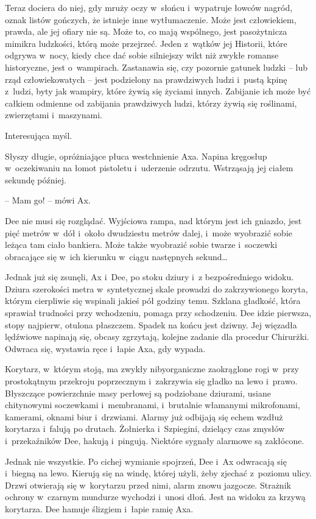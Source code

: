 \documentclass[oneside,polish,11pt,sfheadings]{mwbk}
\begin{document}
Teraz dociera do niej, gdy mruży oczy w~słońcu i~wypatruje łowców
nagród, oznak listów gończych, że istnieje inne wytłumaczenie. Może jest
człowiekiem, prawda, ale jej ofiary nie są. Może to, co mają wspólnego,
jest pasożytnicza mimikra ludzkości, którą może przejrzeć. Jeden z~wątków jej Historii, które odgrywa w~nocy, kiedy chce dać sobie
silniejszy wikt niż zwykłe romanse historyczne, jest o~wampirach.
Zastanawia się, czy pozornie gatunek ludzki -- lub rząd człowiekowatych -- jest podzielony na prawdziwych ludzi i~pustą kpinę z~ludzi, byty jak
wampiry, które żywią się życiami innych. Zabijanie ich może być całkiem
odmienne od zabijania prawdziwych ludzi, którzy żywią się roślinami,
zwierzętami i~maszynami.

Interesująca myśl.

Słyszy długie, opróżniające płuca westchnienie Axa. Napina kręgosłup w~oczekiwaniu na łomot pistoletu i~uderzenie odrzutu. Wstrząsają jej
ciałem sekundę później.

-- Mam go! -- mówi Ax.

Dee nie musi się rozglądać. Wyjściowa rampa, nad którym jest ich
gniazdo, jest pięć metrów w~dół i~około dwudziestu metrów dalej, i~może
wyobrazić sobie leżąca tam ciało bankiera. Może także wyobrazić sobie
twarze i~soczewki obracające się w~ich kierunku w~ciągu następnych
sekund\ldots

Jednak już się zsunęli, Ax i~Dee, po stoku dziury i~z bezpośredniego
widoku. Dziura szerokości metra w~syntetycznej skale prowadzi do
zakrzywionego koryta, którym cierpliwie się wspinali jakieś pół godziny
temu. Szklana gładkość, która sprawiał trudności przy wchodzeniu, pomaga
przy schodzeniu. Dee idzie pierwsza, stopy najpierw, otulona płaszczem.
Spadek na końcu jest dziwny. Jej więzadła lędźwiowe napinają się, obcasy
zgrzytają, kolejne zadanie dla procedur Chirurżki. Odwraca się, wystawia
ręce i~łapie Axa, gdy wypada.

Korytarz, w~którym stoją, ma zwykły nibyorganiczne zaokrąglone rogi w~przy prostokątnym przekroju poprzecznym i~zakrzywia się gładko na lewo i~prawo. Błyszczące powierzchnie masy perłowej są podziobane dziurami,
usiane chitynowymi soczewkami i~membranami, i~brutalnie włamanymi
mikrofonami, kamerami, oknami biur i~drzwiami. Alarmy już odbijają się
echem wzdłuż korytarza i~falują po drutach. Żołnierka i~Szpiegini,
dzielący czas zmysłów i~przekaźników Dee, hakują i~pingują. Niektóre
sygnały alarmowe są zakłócone.

Jednak nie wszystkie. Po cichej wymianie spojrzeń, Dee i~Ax odwracają
się i~biegną na lewo. Kierują się na windę, której użyli, żeby zjechać z~poziomu ulicy. Drzwi otwierają się w~korytarzu przed nimi, alarm znowu
jazgocze. Strażnik ochrony w~czarnym mundurze wychodzi i~unosi dłoń.
Jest na widoku za krzywą korytarza. Dee hamuje ślizgiem i~łapie ramię
Axa.
\end{document}
